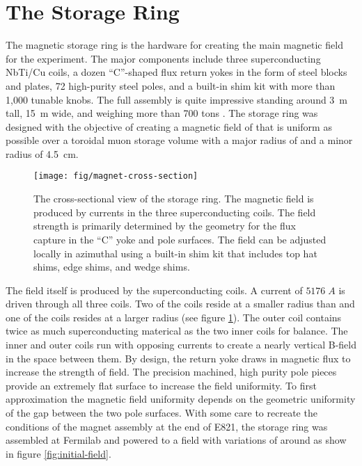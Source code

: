\section{The Storage Ring} \label{sec:storage-ring}

The magnetic storage ring is the hardware for creating the main magnetic field for the experiment.  The major components include three superconducting NbTi/Cu coils, a dozen ``C''-shaped flux return yokes in the form of steel blocks and plates, 72 high-purity steel poles, and a built-in shim kit with more than 1,000 tunable knobs.  The full assembly is quite impressive standing around \SI{3}{\meter} tall, \SI{15}{\meter} wide, and weighing more than 700 tons \cite{e989-tdr}.  The storage ring was designed with the objective of creating a magnetic field of \bmagic that is uniform as possible over a toroidal muon storage volume with a major radius of \rmagic and a minor radius of \SI{4.5}{\cm}.

\begin{figure}
\label{fig:magnet-cross-section}
\centering
\texttt{[image: fig/magnet-cross-section]}
\caption{The cross-sectional view of the storage ring.  The magnetic field is produced by currents in the three superconducting coils.  The field strength is primarily determined by the geometry for the flux capture in the ``C'' yoke and pole surfaces.  The field can be adjusted locally in azimuthal using a built-in shim kit that includes top hat shims, edge shims, and wedge shims.}
\end{figure}

The field itself is produced by the superconducting coils.  A current of $5176\;A$ is driven through all three coils.  Two of the coils reside at a smaller radius than \rmagic and one of the coils resides at a larger radius (see figure \ref{fig:magnet-cross-section}).  The outer coil contains twice as much superconducting materical as the two inner coils for balance.  The inner and outer coils run with opposing currents to create a nearly vertical B-field in the space between them.  By design, the return yoke draws in magnetic flux to increase the strength of field.  The precision machined, high purity pole pieces provide an extremely flat surface to increase the field uniformity.  To first approximation the magnetic field uniformity depends on the geometric uniformity of the gap between the two pole surfaces.  With some care to recreate the conditions of the magnet assembly at the end of E821, the storage ring was assembled at Fermilab and powered to a field with variations of around  as show in figure \ref{fig:initial-field}.

